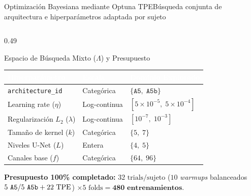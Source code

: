 \begin{frame}{Optimizaci\'on Bayesiana mediante Optuna TPE}{B\'usqueda conjunta de arquitectura e hiperpar\'ametros adaptada por sujeto \cite{Bergstra2011,akiba2019optuna,rodas_valencia_tpe_ecog}}
\begin{columns}[T,onlytextwidth]
    \begin{column}{0.49\textwidth}
      \begin{block}{Espacio de B\'usqueda Mixto ($\Lambda$) y Presupuesto}
        \scriptsize
        \centering
        \renewcommand{\arraystretch}{1.2}
        \setlength{\tabcolsep}{2.8pt}
        \begin{tabular}{@{} l l l @{}}
          \toprule
          \rowcolor{ipnDark}
          \textcolor{white}{\textbf{Hiperpar\'ametro}} &
          \textcolor{white}{\textbf{Escala}} &
          \textcolor{white}{\textbf{Dominio Explorado}} \\
          \midrule
          \texttt{architecture\_id} & Categ\'orica & $\{\texttt{A5},\; \texttt{A5b}\}$ \\
          \rowcolor{rowLight}
          Learning rate ($\eta$) & Log-continua & $[5\times 10^{-5},\; 5\times 10^{-4}]$ \\
          Regularizaci\'on $L_2$ ($\lambda$) & Log-continua & $[10^{-7},\; 10^{-3}]$ \\
          \rowcolor{rowLight}
          Tama\~no de kernel ($k$) & Categ\'orica & $\{5,\; 7\}$ \\
          Niveles U-Net ($L$) & Entera & $\{4,\; 5\}$ \\
          \rowcolor{rowLight}
          Canales base ($f$) & Categ\'orica & $\{64,\; 96\}$ \\
          \bottomrule
        \end{tabular}
        \vspace{1mm}

        {\scriptsize\textbf{Presupuesto 100\% completado:} $32\text{ trials/sujeto}$ ($10$ \textit{warmups} balanceados $5\text{ \texttt{A5}}/5\text{ \texttt{A5b}} + 22\text{ TPE}$) $\times 5\text{ folds} = \mathbf{480\text{ entrenamientos}}$.}
      \end{block}
    \end{column}
  \end{columns}
\end{frame}

